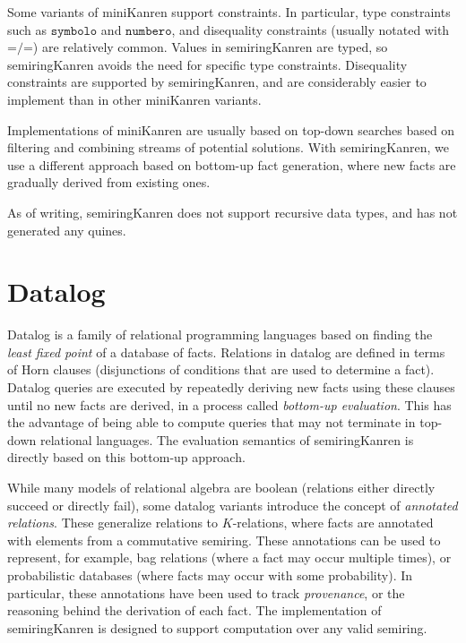 \documentclass{report}
\theoremstyle{definition}
\begin{document}
Some variants of miniKanren support constraints.
In particular, type constraints such as \(\texttt{symbolo}\) and \(\texttt{numbero}\),
and disequality constraints (usually notated with \(\texttt{=/=}\)) are relatively common.
Values in semiringKanren are typed, so semiringKanren avoids the need for specific type constraints.
Disequality constraints are supported by semiringKanren, and are considerably easier to implement than in other miniKanren variants.

Implementations of miniKanren are usually based on top-down searches based on filtering and combining streams of potential solutions.
With semiringKanren, we use a different approach based on bottom-up fact generation, where new facts are gradually derived from existing ones.

As of writing, semiringKanren does not support recursive data types, and has not generated any quines.

\section{Datalog}

Datalog\cite{green2007} is a family of relational programming languages based on finding the \emph{least fixed point} of a database of facts.
Relations in datalog are defined in terms of Horn clauses (disjunctions of conditions that are used to determine a fact).
Datalog queries are executed by repeatedly deriving new facts using these clauses until no new facts are derived, in a process called \emph{bottom-up evaluation}.
This has the advantage of being able to compute queries that may not terminate in top-down relational languages.
The evaluation semantics of semiringKanren is directly based on this bottom-up approach.

While many models of relational algebra are boolean (relations either directly succeed or directly fail), some datalog variants introduce the concept of \emph{annotated relations}.
These generalize relations to \(K\)-relations, where facts are annotated with elements from a commutative semiring.
These annotations can be used to represent, for example, bag relations (where a fact may occur multiple times), or probabilistic databases (where facts may occur with some probability).
In particular, these annotations have been used to track \emph{provenance}, or the reasoning behind the derivation of each fact.
The implementation of semiringKanren is designed to support computation over any valid semiring.
\end{document}
